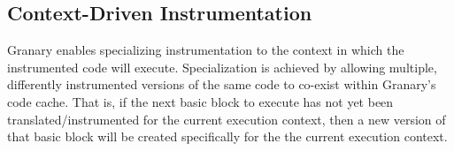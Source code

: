 \documentclass[preprint]{sigplanconf}
\newcommand{\toolname}[1]{{\scshape #1}}
\begin{document}
\subsection{Context-Driven Instrumentation}\label{sec:policies}



Granary enables specializing instrumentation to the context in which the instrumented code will execute. Specialization is achieved by allowing multiple, differently instrumented versions of the same code to co-exist within Granary's code cache. That is, if the next basic block to execute has not yet been translated/instrumented for the current execution context, then a new version of that basic block will be created  specifically for the the current execution context.



\end{document}
